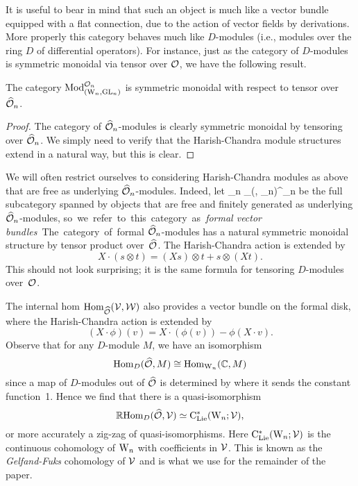 It is useful to bear in mind that such an object is much like a vector bundle equipped with a flat connection,
due to the action of vector fields by derivations.
More properly this category behaves much like $D$-modules (i.e., modules over the ring $D$ of differential operators).
For instance, just as the category of $D$-modules is symmetric monoidal via tensor over $\mathcal O$, we have the following result.

\begin{lemma}
The category ${\rm Mod}^{\mathcal O_n}_{({{\rm W}_n}, {\rm GL}_n)}$ is symmetric monoidal with respect to tensor over $\widehat{\mathcal O}_n$.
\end{lemma} 

\begin{proof}
The category of $\widehat{\mathcal O}_n$-modules is clearly symmetric monoidal by tensoring over $\widehat{\mathcal O}_n$. We simply need to verify that the Harish-Chandra module structures extend in a natural way, but this is clear.
\end{proof}

We will often restrict ourselves to considering Harish-Chandra modules as above that are free as underlying $\widehat{\mathcal O}_n$-modules. 
Indeed, let
\ben
\VB_n \subset \Mod_{(\Vect, \GL_n)}^{\cO_n}
\een
be the full subcategory spanned by objects that are free and finitely generated as underlying $\widehat{\mathcal O}_n$-modules, \si
so we refer to this category as {\em formal vector bundles}.

The category of formal $\widehat{\mathcal O}_n$-modules has a natural symmetric monoidal structure by tensor product over~$\widehat{\mathcal O}$. The Harish-Chandra action is extended by
\[
X \cdot (s \otimes t) = (X s) \otimes t + s \otimes (Xt). 
\]
This should not look surprising; it is the same formula for tensoring
$D$-modules over~$\mathcal O$. 

The internal hom ${\rm Hom}_{\widehat{\mathcal O}}(\mathcal{V},\mathcal{W})$ also provides a vector bundle on the formal disk, 
where the Harish-Chandra action is extended by
\[
(X \cdot \phi)(v) = X \cdot (\phi(v)) - \phi(X\cdot v). 
\]
Observe that for any $D$-module $M$, we have an isomorphism
\[
{\rm Hom}_{D}(\widehat{\mathcal O}, M) \cong {\rm Hom}_{{{\rm W}_n}}(\mathbb C, M)
\]
since a map of $D$-modules out of $\widehat{\mathcal O}$ is determined by where it sends the constant function~1. 
Hence we find that there is a quasi-isomorphism 
\[
\mathbb R{\rm Hom}_{D}(\widehat{\mathcal O}, \mathcal{V}) \simeq {\rm C}_{{\rm Lie}}^*({{\rm W}_n} ; \mathcal{V}),
\]
or more accurately a zig-zag of quasi-isomorphisms. Here
${\rm C}_{{\rm Lie}}^*({{\rm W}_n} ; \mathcal{V})$ is the continuous cohomology of ${{\rm W}_n}$ with
coefficients in $\mathcal{V}$. This is known as the {\em Gelfand-Fuks}
cohomology of $\mathcal{V}$ and is what we use for the remainder of the
paper. 

